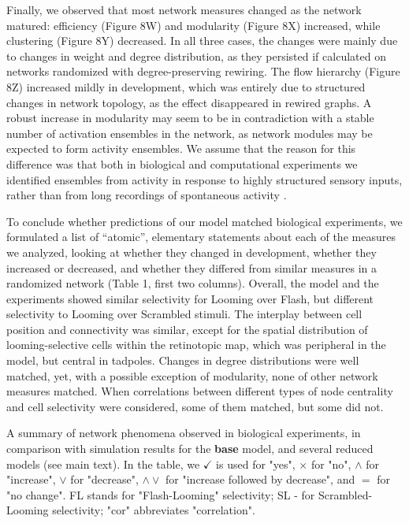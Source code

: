 \documentclass{article}
\begin{document}
Finally, we observed that most network measures changed as the network matured: efficiency (Figure 8W) and modularity (Figure 8X) increased, while clustering (Figure 8Y) decreased. In all three cases, the changes were mainly due to changes in weight and degree distribution, as they persisted if calculated on networks randomized with degree-preserving rewiring. The flow hierarchy (Figure 8Z) increased mildly in development, which was entirely due to structured changes in network topology, as the effect disappeared in rewired graphs. A robust increase in modularity may seem to be in contradiction with a stable number of activation ensembles in the network, as network modules may be expected to form activity ensembles. We assume that the reason for this difference was that both in biological and computational experiments we identified ensembles from activity in response to highly structured sensory inputs, rather than from long recordings of spontaneous activity \citep{triplett2018emergence}.

To conclude whether predictions of our model matched biological experiments, we formulated a list of “atomic”, elementary statements about each of the measures we analyzed, looking at whether they changed in development, whether they increased or decreased, and whether they differed from similar measures in a randomized network (Table 1, first two columns). Overall, the model and the experiments showed similar selectivity for Looming over Flash, but different selectivity to Looming over Scrambled stimuli. The interplay between cell position and connectivity was similar, except for the spatial distribution of looming-selective cells within the retinotopic map, which was peripheral in the model, but central in tadpoles. Changes in degree distributions were well matched, yet, with a possible exception of modularity, none of other network measures matched. When correlations between different types of node centrality and cell selectivity were considered, some of them matched, but some did not.

\begin{table}
    
    \caption{A summary of network phenomena observed in biological experiments, in comparison with simulation results for the \textbf{base} model, and several reduced models (see main text). In the table, we $\checkmark$ is used for "yes", $\times$ for "no", $\land$ for "increase", $\lor$ for "decrease", $\land \lor$ for "increase followed by decrease", and $=$ for "no change". FL stands for "Flash-Looming" selectivity; SL - for Scrambled-Looming selectivity; "cor" abbreviates "correlation".}
\end{table}
\end{document}
